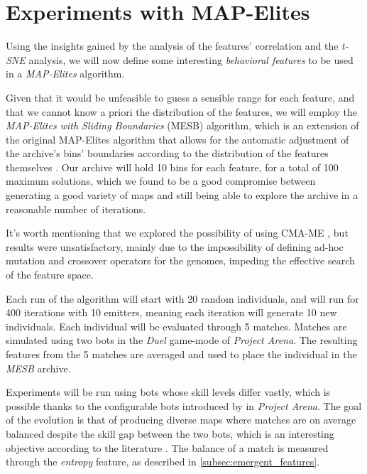 \section{Experiments with MAP-Elites}
Using the insights gained by the analysis of the features' correlation and the \textit{t-SNE} analysis, we will now define some interesting \textit{behavioral features} to be used in a \textit{MAP-Elites} algorithm. 

Given that it would be unfeasible to guess a sensible range for each feature, and that we cannot know a priori the distribution of the features, we will employ the \textit{MAP-Elites with Sliding Boundaries} (MESB) algorithm, which is an extension of the original MAP-Elites algorithm that allows for the automatic adjustment of the archive's bins' boundaries according to the distribution of the features themselves \cite{fontaine_mapping_2019}. Our archive will hold 10 bins for each feature, for a total of 100 maximum solutions, which we found to be a good compromise between generating a good variety of maps and still being able to explore the archive in a reasonable number of iterations.

It's worth mentioning that we explored the possibility of using CMA-ME \cite{fontaine_covariance_2020}, but results were unsatisfactory, mainly due to the impossibility of defining ad-hoc mutation and crossover operators for the genomes, impeding the effective search of the feature space.

Each run of the algorithm will start with 20 random individuals, and will run for 400 iterations with 10 emitters, meaning each iteration will generate 10 new individuals. Each individual will be evaluated through 5 matches. Matches are simulated using two bots in the \textit{Duel} game-mode of \textit{Project Arena}. The resulting features from the 5 matches are averaged and used to place the individual in the \textit{MESB} archive. 

Experiments will be run using bots whose skill levels differ vastly, which is possible thanks to the configurable bots introduced by \citeauthor{bari_evolutionary-based_2023} in \textit{Project Arena}. The goal of the evolution is that of producing diverse maps where matches are on average balanced despite the skill gap between the two bots, which is an interesting objective according to the literature \cite{lanzi_evolving_2014} \cite{bari_evolutionary-based_2023}. The balance of a match is measured through the \textit{entropy} feature, as described in \cref{subsec:emergent_features}.

